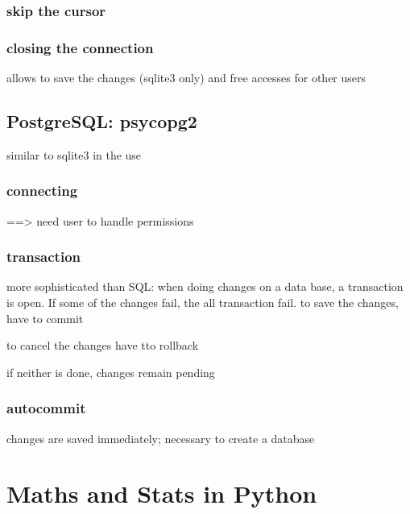 	\subsubsection{skip the cursor}

	\subsubsection{closing the connection}

		allows to save the changes (sqlite3 only) and free accesses for other users


		\subsection{PostgreSQL: psycopg2}
			similar to sqlite3 in the use

		\subsubsection{connecting}
			

			 ==> need user to handle permissions

		\subsubsection{transaction}
	
			more sophisticated than SQL: when doing changes on a data base, a transaction is open. If some of the changes fail, the all transaction fail. 
			 to save the changes, have to commit

			 to cancel the changes have tto rollback

			if neither is done, changes remain pending

		\subsubsection{autocommit}
			 changes are saved immediately; necessary to create a database


\section{Maths and Stats in Python}

